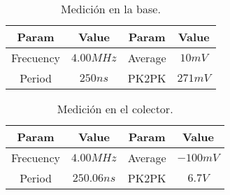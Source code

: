 
\begin{table}[H]
\begin{center}
\begin{tabular}{| c | c || c | c |}
\hline
Param & Value & Param & Value \\ \hline 
Frecuency  & $4.00 MHz$ & Average & $10 mV$ \\ \hline
Period & $250 ns$ & PK2PK & $271 mV$ \\\hline

\end{tabular}
\caption{Medición en la base.}
\label{tab:1}
\end{center}
\end{table}





\begin{table}[H]
\begin{center}
\begin{tabular}{| c | c || c | c |}
\hline
Param & Value & Param & Value \\ \hline 
Frecuency  & $4.00 MHz$ & Average & $-100 mV$ \\ \hline
Period & $250.06 ns$ & PK2PK & $6.7 V$ \\\hline

\end{tabular}
\caption{Medición en el colector.}
\label{tab:1}
\end{center}
\end{table}
   